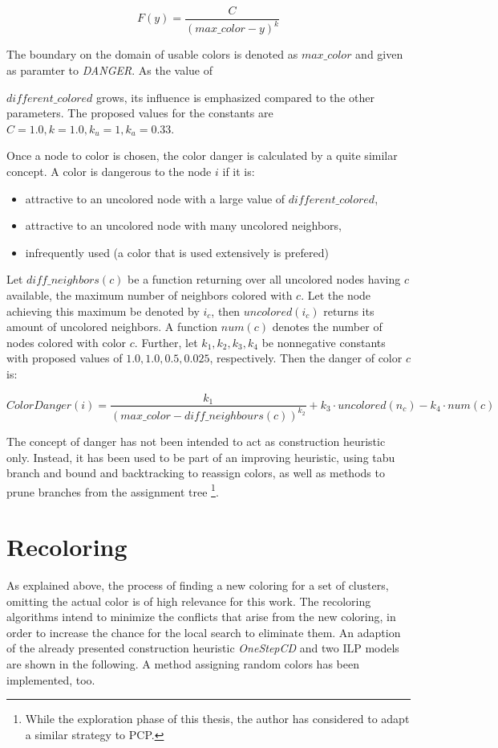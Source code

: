 $$ F(y) = \frac{C}{(\mathit{max\_color}-y)^k} $$

The boundary on the domain of usable colors is denoted as $\mathit{max\_color}$ and given as paramter to \textit{DANGER}. As the value of 

$\mathit{different\_colored}$ grows, its influence is emphasized compared to the other parameters. The proposed values for the constants are $C=1.0, k=1.0, k_u=1, k_a=0.33$.


Once a node to color is chosen, the color danger is calculated by a quite similar concept. A color is dangerous to the node $i$ if it is:

\begin{itemize}
\item attractive to an uncolored node with a large value of $\mathit{different\_colored}$,
\item attractive to an uncolored node with many uncolored neighbors,
\item infrequently used (a color that is used extensively is prefered)\cite{glover-96}
\end{itemize}

Let $\mathit{diff\_neighbors}(c)$ be a function returning over all uncolored nodes having $c$ available, the maximum number of neighbors colored with $c$. Let the node achieving this maximum be denoted by $i_c$, then $\mathit{uncolored}(i_c)$ returns its amount of uncolored neighbors. A function $num(c)$ denotes the number of nodes colored with color $c$. Further, let $k_1,k_2,k_3,k_4$ be nonnegative constants with proposed values of $1.0,1.0,0.5,0.025$, respectively. Then the danger of color $c$ is:

$$ \mathit{ColorDanger}(i) = \frac{k_1}{(\mathit{max\_color} - \mathit{diff\_neighbours}(c))^{k_2}} + k_3 \cdot \mathit{uncolored}(n_c) - k_4 \cdot num(c) $$

The concept of danger has not been intended to act as construction heuristic only. Instead, it has been used to be part of an improving heuristic, using tabu branch and bound and backtracking to reassign colors, as well as methods to prune branches from the assignment tree \footnote{While the exploration phase of this thesis, the author has considered to adapt a similar strategy to PCP.}.

\section{Recoloring}
\label{sec:recoloring}
As explained above, the process of finding a new coloring for a set of clusters, omitting the actual color is of high relevance for this work. The recoloring algorithms intend to minimize the conflicts that arise from the new coloring, in order to increase the chance for the local search to eliminate them. An adaption of the already presented construction heuristic \textit{OneStepCD} and two ILP models are shown in the following. A method assigning random colors has been implemented, too.

